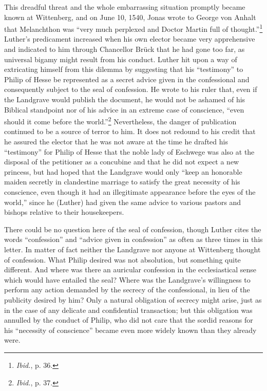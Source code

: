 This dreadful threat and the whole embarrassing situation promptly
became known at Wittenberg, and on June 10, 1540, Jonas wrote to
George von Anhalt that Melanchthon was “very much perplexed
and Doctor Martin full of thought.”\footnote{\textit{Ibid.}, p. 36.}
 Luther’s predicament increased
when his own elector became very apprehensive and indicated to him through
Chancellor Brück that he had gone too far,
as universal bigamy might result from his conduct. Luther hit upon
a way of extricating himself from this dilemma by suggesting that his
“testimony” to Philip of Hesse be represented as a secret advice given
in the confessional and consequently subject to the seal of confession.
He wrote to his ruler that, even if the Landgrave would publish the
document, he would not be ashamed of his Biblical standpoint nor of
his advice in an extreme case of conscience, “even should it come before
the world.”\footnote{\textit{Ibid.}, p. 37.}
 Nevertheless, the danger of publication continued
to be a source of terror to him. It does not redound to his credit that
he assured the elector that he was not aware at the time he drafted his
“testimony” for Philip of Hesse that the noble lady of Eschwege
was also at the disposal of the petitioner as a concubine and that he
did not expect a new princess, but had hoped that the Landgrave
would only “keep an honorable maiden secretly in clandestine marriage
to satisfy the great necessity of his conscience, even though it
had an illegitimate appearance before the eyes of the world,” since
he (Luther) had given the same advice to various pastors and bishops
relative to their housekeepers.

There could be no question here of the seal of confession, though
Luther cites the words “confession” and “advice given in confession”
as often as three times in this letter. In matter of fact neither the
Landgrave nor anyone at Wittenberg thought of confession. What
Philip desired was not absolution, but something quite different. And
where was there an auricular confession in the ecclesiastical sense
which would have entailed the seal? Where was the Landgrave’s willingness
to perform any action demanded by the secrecy of the confessional, in
lieu of the publicity desired by him? Only a natural
obligation of secrecy might arise, just as in the case of any delicate
and confidential transaction; but this obligation was annulled by the
conduct of Philip, who did not care that the sordid reasons for his
``necessity of conscience'' became even more widely known than they
already were.

